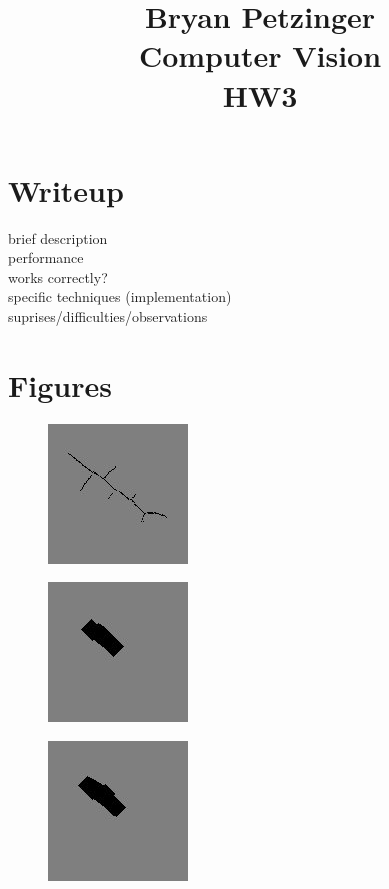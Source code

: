 \documentclass{article}
\begin{document}
\title{
Bryan Petzinger \\
Computer Vision \\
HW3 \\
}
\maketitle

\section{Writeup}
brief description \\
performance \\
works correctly? \\
specific techniques (implementation) \\
suprises/difficulties/observations \\

\section{Figures}

\begin{figure}[h]
\caption{}
\centering
\includegraphics{images/skeleton.jpg}
\end{figure}

\begin{figure}[h]
\caption{}
\centering
\includegraphics{images/rebuilt_image10.jpg}
\end{figure}

\begin{figure}[h]
\caption{}
\centering
\includegraphics{images/rebuilt_image9.jpg}
\end{figure}
\end{document}
